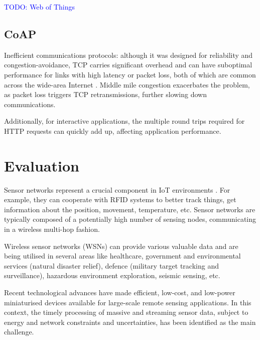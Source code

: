 \documentclass{ieeeaccess}
\begin{document}
\textcolor{blue}{TODO: Web of Things}

\subsection{CoAP}

Inefficient communications protocols: although it was designed for reliability and congestion-avoidance, TCP carries significant overhead and can have suboptimal performance for links with high latency or packet loss, both of which are common across the wide-area Internet \cite{akamai}. Middle mile congestion exacerbates the problem, as packet loss triggers TCP retransmissions, further slowing down communications.

Additionally, for interactive applications, the multiple round trips required for HTTP requests can quickly add up, affecting application performance.

\section{Evaluation}
\label{sec:evaluation}

Sensor networks represent a crucial component in IoT environments \cite{edge-computing-survey}. For example, they can cooperate with RFID systems to better track things, get information about the position, movement, temperature, etc. Sensor networks are typically composed of a potentially high number of sensing nodes, communicating in a wireless multi-hop fashion.

Wireless sensor networks (WSNs) can provide various valuable data and are being utilised in several areas like healthcare, government and environmental services (natural disaster relief), defence (military target tracking and surveillance), hazardous environment exploration, seismic sensing, etc.

Recent technological advances have made efficient, low-cost, and low-power miniaturised devices available for large-scale remote sensing applications. In this context, the timely processing of massive and streaming sensor data, subject to energy and network constraints and uncertainties, has been identified as the main challenge.

\end{document}
